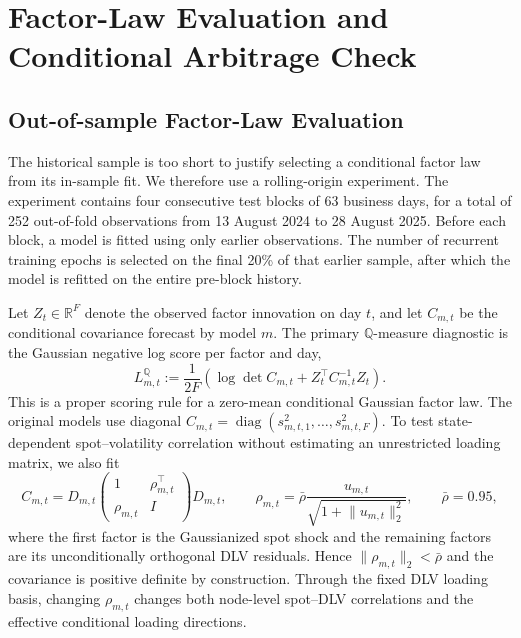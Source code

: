\documentclass[11pt]{article}
\newcommand{\R}{\mathbb R}
\newcommand{\Q}{\mathbb Q}
\theoremstyle{plain}
\theoremstyle{definition}
\theoremstyle{remark}
\begin{document}
\section{Factor-Law Evaluation and Conditional Arbitrage Check}
\label{sec:factor-law-and-hedging}

\subsection{Out-of-sample Factor-Law Evaluation}
\label{sec:factor-law-evaluation}

The historical sample is too short to justify selecting a conditional
factor law from its in-sample fit.  We therefore use a rolling-origin
experiment.  The experiment contains four consecutive test blocks of 63
business days, for a total of 252 out-of-fold observations from 13 August
2024 to 28 August 2025.  Before each block, a model is fitted using only
earlier observations.  The number of recurrent training epochs is selected
on the final 20\% of that earlier sample, after which the model is refitted
on the entire pre-block history.

Let $Z_t\in\R^F$ denote the observed factor innovation on day $t$, and let
$C_{m,t}$ be the conditional covariance forecast by model $m$.  The primary
$\Q$-measure diagnostic is the Gaussian negative log score per factor and day,
\begin{equation}
  L^\Q_{m,t}
  :=
  \frac{1}{2F}\left(
    \log\det C_{m,t}
    +Z_t^\top C_{m,t}^{-1}Z_t
  \right).
  \label{eq:q-factor-log-score}
\end{equation}
This is a proper scoring rule for a zero-mean conditional Gaussian factor
law.  The original models use diagonal
$C_{m,t}=\operatorname{diag}(s_{m,t,1}^2,\ldots,s_{m,t,F}^2)$.  To test
state-dependent spot--volatility correlation without estimating an
unrestricted loading matrix, we also fit
\begin{equation}
  C_{m,t}=D_{m,t}
  \begin{pmatrix}1&\rho_{m,t}^\top\\ \rho_{m,t}&I\end{pmatrix}
  D_{m,t},
  \qquad
  \rho_{m,t}
  =\bar\rho\frac{u_{m,t}}{\sqrt{1+\lVert u_{m,t}\rVert_2^2}},
  \qquad \bar\rho=0.95,
  \label{eq:conditional-spot-factor-correlation}
\end{equation}
where the first factor is the Gaussianized spot shock and the remaining
factors are its unconditionally orthogonal DLV residuals.  Hence
$\lVert\rho_{m,t}\rVert_2<\bar\rho$ and the covariance is positive definite
by construction.  Through the fixed DLV loading basis, changing
$\rho_{m,t}$ changes both node-level spot--DLV correlations and the effective
conditional loading directions.
\end{document}
